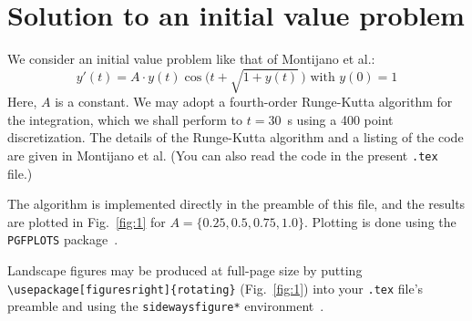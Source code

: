 \documentclass[grid,colorlinks,nofoot]{asmeconf}
\newcommand\addLUADEDplot[4][]{%
     \directlua{print_RKfour(#2,#3,#4,[[#1]])}%
}
\begin{document}
\section{Solution to an initial value problem}
We consider an initial value problem like that of Montijano et al.:
\begin{equation}\label{eqn:1}
y'(t) = A\cdot y(t) \cos\Big(t + \sqrt{1 + y(t)}\,\Big) \text{ with }y(0)=1
\end{equation}
Here, $A$ is a constant. We may adopt a fourth-order Runge-Kutta algorithm for the integration, which we shall perform to $t = 30$~s using a 400 point discretization.  The details of the Runge-Kutta algorithm and a listing of the code are given in Montijano et al. (You can also read the code in the present \texttt{.tex} file.)

The algorithm is implemented directly in the preamble of this file, and the results are plotted in Fig.~\ref{fig:1} for $A = \{0.25, 0.5, 0.75, 1.0\}$. Plotting is done using the \texttt{PGFPLOTS} package~\cite{pgfplots}.

Landscape figures may be produced at full-page size by putting \verb|\usepackage[figuresright]{rotating}| (Fig.~\ref{fig:1}) into your \texttt{.tex} file's preamble and using the \texttt{sidewaysfigure*} environment~\cite{fairbairns}.

\begin{sidewaysfigure*}
\caption{\MakeUppercase{A trial of pgfplot with Luacode Runge-Kutta integration}\label{fig:1}}
\end{sidewaysfigure*}
\end{document}
